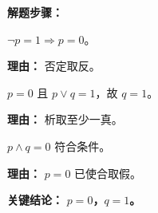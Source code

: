 \begin{examplebox}
	\textbf{\textcolor{CExample}{解题步骤：}}
	\begin{description}[style=nextline, leftmargin=2.8em, labelsep=0.5em, itemsep=0.45em]
		\item[\textbf{第一步（由 $\lnot p$ 得 $p$）：}] $\lnot p=1 \Rightarrow p=0$。
			\par\textbf{理由：}
			否定取反。
		\item[\textbf{第二步（由 $p\lor q=1$ 得 $q$）：}] $p=0$ 且 $p\lor q=1$，故 $q=1$。
			\par\textbf{理由：}
			析取至少一真。
		\item[\textbf{第三步（验证 $p\land q$）：}] $p\land q=0$ 符合条件。
			\par\textbf{理由：}
			$p=0$ 已使合取假。
	\end{description}

	\textbf{\textcolor{CExample}{关键结论：}}
	\textbf{$p=0$，$q=1$。}
\end{examplebox}

